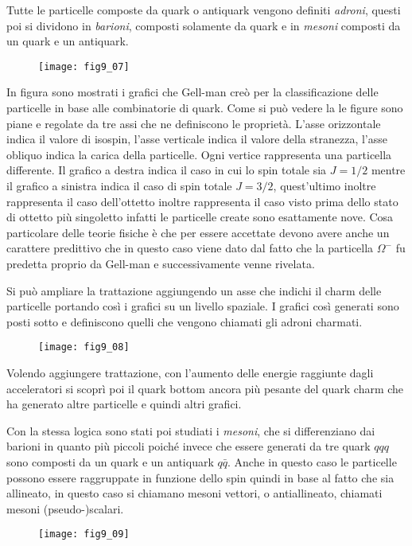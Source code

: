 Tutte le particelle composte da quark o antiquark vengono definiti \emph{adroni}, questi poi si dividono in \emph{barioni}, composti solamente da quark e in \emph{mesoni} composti da un quark e un antiquark.
\begin{figure}[h]
\centering
\texttt{[image: fig9\_07]}
\end{figure}

In figura sono mostrati i grafici che Gell-man creò per la classificazione delle particelle in base alle combinatorie di quark.
Come si può vedere la le figure sono piane e regolate da tre assi che ne definiscono le proprietà.
L'asse orizzontale indica il valore di isospin, l'asse verticale indica il valore della stranezza, l'asse obliquo indica la carica della particelle.
Ogni vertice rappresenta una particella differente.
Il grafico a destra indica il caso in cui lo spin totale sia $J=1/2$ mentre il grafico a sinistra indica il caso di spin totale $J=3/2$, quest'ultimo inoltre rappresenta il caso dell'ottetto inoltre rappresenta il caso visto prima dello stato di ottetto più singoletto infatti le particelle create sono esattamente nove.
Cosa particolare delle teorie fisiche è che per essere accettate devono avere anche un carattere predittivo che in questo caso viene dato dal fatto che la particella $\Omega^-$ fu predetta proprio da Gell-man e successivamente venne rivelata.

Si può ampliare la trattazione aggiungendo un asse che indichi il charm delle particelle portando così i grafici su un livello spaziale.
I grafici così generati sono posti sotto e definiscono quelli che vengono chiamati gli adroni charmati.
\begin{figure}[h]
\centering
\texttt{[image: fig9\_08]}
\end{figure}

Volendo aggiungere trattazione, con l'aumento delle energie raggiunte dagli acceleratori si scoprì poi il quark bottom ancora più pesante del quark charm che ha generato altre particelle e quindi altri grafici.

Con la stessa logica sono stati poi studiati i \emph{mesoni}, che si differenziano dai barioni in quanto più piccoli poiché invece che essere generati da tre quark $qqq$ sono composti da un quark e un antiquark $q\bar{q}$.
Anche in questo caso le particelle possono essere raggruppate in funzione dello spin quindi in base al fatto che sia allineato, in questo caso si chiamano mesoni vettori, o antiallineato, chiamati mesoni (pseudo-)scalari.
\begin{figure}[h]
\centering
\texttt{[image: fig9\_09]}
\end{figure}

